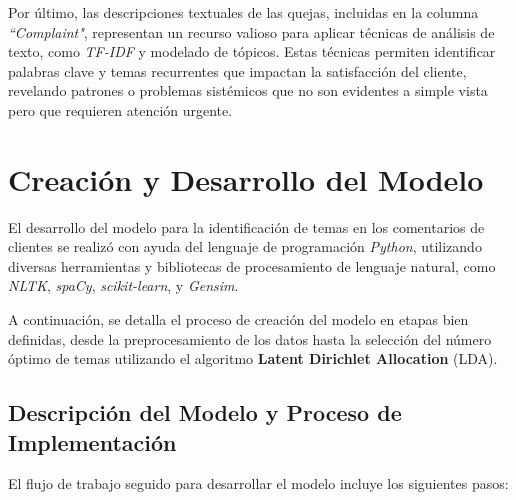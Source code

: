 \documentclass{matematicasud}
\begin{document}
Por último, las descripciones textuales de las quejas, incluidas en la columna \textit{``Complaint"}, representan un recurso valioso para aplicar técnicas de análisis de texto, como \textit{TF-IDF} y modelado de tópicos. Estas técnicas permiten identificar palabras clave y temas recurrentes que impactan la satisfacción del cliente, revelando patrones o problemas sistémicos que no son evidentes a simple vista pero que requieren atención urgente.

\newpage
\section{Creación y Desarrollo del Modelo}

El desarrollo del modelo para la identificación de temas en los comentarios de clientes se realizó con ayuda del lenguaje de programación \textit{Python}, utilizando diversas herramientas y bibliotecas de procesamiento de lenguaje natural, como \textit{NLTK}, \textit{spaCy}, \textit{scikit-learn}, y \textit{Gensim}.

A continuación, se detalla el proceso de creación del modelo en etapas bien definidas, desde la preprocesamiento de los datos hasta la selección del número óptimo de temas utilizando el algoritmo \textbf{Latent Dirichlet Allocation} (LDA).

\subsection{Descripción del Modelo y Proceso de Implementación}

El flujo de trabajo seguido para desarrollar el modelo incluye los siguientes pasos:
\end{document}
